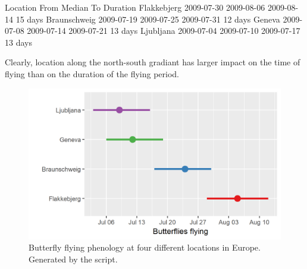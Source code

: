 \begin{rscript}
    Location       From     Median         To Duration
 Flakkebjerg 2009-07-30 2009-08-06 2009-08-14  15 days
Braunschweig 2009-07-19 2009-07-25 2009-07-31  12 days
      Geneva 2009-07-08 2009-07-14 2009-07-21  13 days
   Ljubljana 2009-07-04 2009-07-10 2009-07-17  13 days
\end{rscript}

Clearly, location along the north-south gradiant has larger impact on the time of flying than on the duration of the flying period.

\begin{figure} [t]
\centering
\includegraphics[width=\textwidth]{graphics/scenarios3}
\caption{Butterfly flying phenology at four different locations in Europe. Generated by the  script.}
\label{fig:scenarios3}
\end{figure}

 